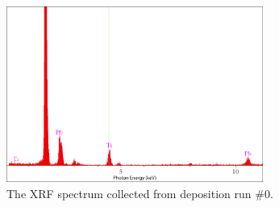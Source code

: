 
\begin{figure}[htbp]
	\centering
	\includegraphics[width=0.75\textwidth]{./Figures/Appendix/Composition/PTO-run0-pre-anneal.png}
	\caption[XRF Spectrum of PTO \#0]%
		     {The XRF spectrum collected from deposition run \#0.  }
	\label{fig:XRF-0-SiO2}
\end{figure}

